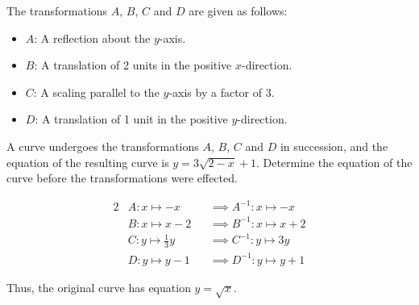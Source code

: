 \begin{problem}
    The transformations $A$, $B$, $C$ and $D$ are given as follows:

    \begin{itemize}
        \item $A$: A reflection about the $y$-axis.
        \item $B$: A translation of 2 units in the positive $x$-direction.
        \item $C$: A scaling parallel to the $y$-axis by a factor of 3.
        \item $D$: A translation of 1 unit in the positive $y$-direction.
    \end{itemize}

    A curve undergoes the transformations $A$, $B$, $C$ and $D$ in succession, and the equation of the resulting curve is $y = 3\sqrt{2-x} + 1$. Determine the equation of the curve before the transformations were effected.
\end{problem}
\begin{solution}
    \begin{alignat*}{2}
        &A \colon x \mapsto -x &&\implies A^{-1} \colon x \mapsto -x\\
        &B \colon x \mapsto x-2 &&\implies B^{-1} \colon x \mapsto x+2\\
        &C \colon y \mapsto \frac13 y &&\implies C^{-1} \colon y \mapsto 3y\\
        &D \colon y \mapsto y-1 &&\implies D^{-1} \colon y \mapsto y+1
    \end{alignat*}

    \begin{center}
    \end{center}

    Thus, the original curve has equation $y = \sqrt{x}$.
\end{solution}

